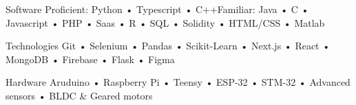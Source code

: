 

\begin{cvskills}

  \cvskill
    {Software} %
    {Proficient: Python • Typescript • C++\space\space\space Familiar: Java • C • Javascript • PHP • Saas • R • SQL • Solidity • HTML/CSS • Matlab }%

  \cvskill
    {Technologies} %
    {Git • Selenium • Pandas • Scikit-Learn • Next.js • React • MongoDB • Firebase • Flask • Figma } %

  \cvskill
    {Hardware} %
    {Aruduino • Raspberry Pi • Teensy • ESP-32 • STM-32 • Advanced sensors • BLDC \& Geared motors} %

\end{cvskills}
